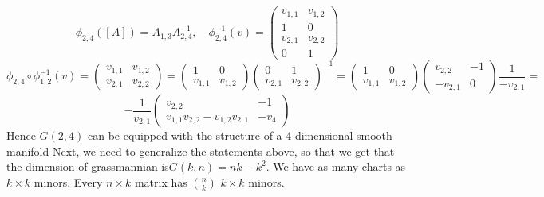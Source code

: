 \documentclass[11pt,a4paper]{report}
\begin{document}
$$ \phi_{2,4}([A]) = A_{1,3} A_{2,4}^{-1}, \quad \phi_{2,4}^{-1}(v) = 
\begin{pmatrix}
v_{1,1} & v_{1,2} \\
1 & 0 \\
v_{2,1} & v_{2,2} \\
0 & 1
\end{pmatrix}
$$
$$ \phi_{2,4} \circ \phi_{1,2}^{-1}(v) = 
\begin{pmatrix}
v_{1,1} & v_{1,2} \\
v_{2,1} & v_{2,2}
\end{pmatrix} =
\begin{pmatrix}
    1 & 0 \\
    v_{1,1} & v_{1,2}
\end{pmatrix}
\begin{pmatrix}
    0 & 1 \\
    v_{2,1} & v_{2,2}
\end{pmatrix} ^{-1}
= 
\begin{pmatrix}
    1 & 0 \\
    v_{1,1} & v_{1,2}
\end{pmatrix}
\begin{pmatrix}
    v_{2,2} & -1 \\
    -v_{2,1} & 0
\end{pmatrix} \frac{1}{-v_{2,1}} = 
$$
$$ -\frac{1}{v_{2,1}} \begin{pmatrix} v_{2,2} & -1 \\ v_{1,1} v_{2,2} - v_{1,2} v_{2,1} & -v_{4} \end{pmatrix}
$$
Hence $G(2,4)$ can be equipped with the structure of a 4 dimensional smooth manifold
\newline
Next, we need to generalize the statements above, so that we get that the dimension of grassmannian is$ G(k,n) = n k-k^2$.
We have as many charts as $k \times k$ minors. Every $ n \times k$ matrix has ${n \choose k}$ $k\times k$ minors.


\setcounter{tocdepth}{1} 

 
\end{document}
